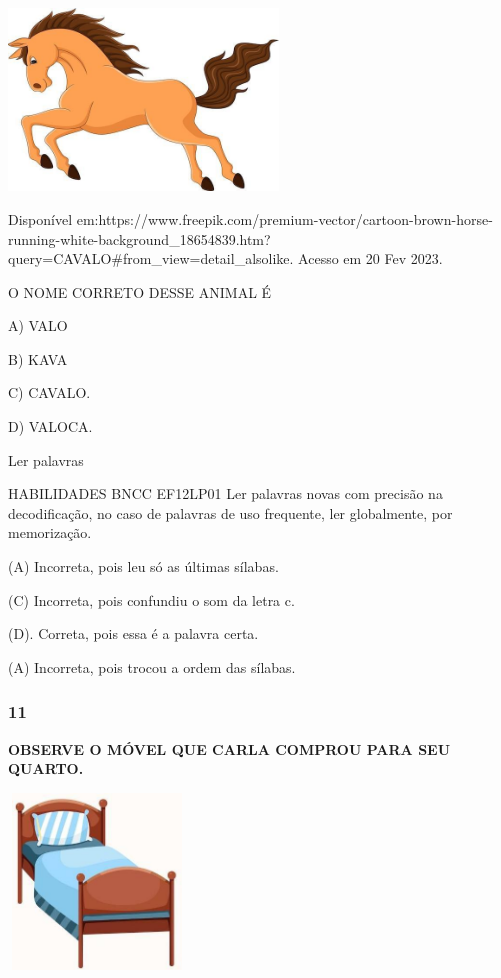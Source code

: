 \begin{escola}
\includegraphics[width=2.82210in,height=1.90975in]{media/image234.jpg}

Disponível
em:https://www.freepik.com/premium-vector/cartoon-brown-horse-running-white-background\_18654839.htm?query=CAVALO\#from\_view=detail\_alsolike.
Acesso em 20 Fev 2023.

O NOME CORRETO DESSE ANIMAL É

A) VALO

B) KAVA

C) CAVALO.

D) VALOCA.

Ler palavras

HABILIDADES BNCC EF12LP01 Ler palavras novas com precisão na
decodificação, no caso de palavras de uso frequente, ler globalmente,
por memorização.

(A) Incorreta, pois leu só as últimas sílabas.

(C) Incorreta, pois confundiu o som da letra c.

(D). Correta, pois essa é a palavra certa.

(A) Incorreta, pois trocou a ordem das
sílabas.\protect\hypertarget{_heading=h.oxa1c0ljwovb}{}{}

\subsubsection{11}\label{section-67}

\textbf{OBSERVE O MÓVEL QUE CARLA COMPROU PARA SEU QUARTO.}

\includegraphics[width=1.84783in,height=1.84783in]{media/image235.jpg}


\end{escola}
